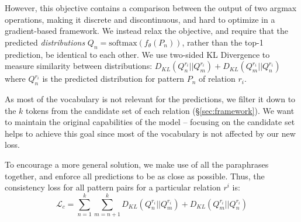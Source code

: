 

However, this objective contains a comparison between the output of two argmax operations, making it discrete and discontinuous, and hard to optimize in a gradient-based framework. We instead relax the objective, and require that the predicted \emph{distributions} $Q_n = \mbox{softmax}(f_\theta(P_n))$, rather than the top-1 prediction, be identical to each other. %
We use two-sided KL Divergence to measure similarity between distributions: $D_{KL}(Q_n^{r_i}||Q_m^{r_i}) + D_{KL}(Q_m^{r_i}||Q_n^{r_i})$
where $Q_n^{r_i}$ is the predicted distribution for pattern $P_n$ of relation $r_i$.


As most of the vocabulary is not relevant for the
predictions, we filter it down to the $k$ tokens from the candidate set of each
relation (\S\ref{sec:framework}). We want to
maintain the original capabilities of the
model -- focusing on the candidate set helps to achieve this goal since most of the vocabulary is not affected by our new
loss.


To encourage a more general solution, we make use of all the paraphrases together, and enforce all predictions to be as close as possible.
Thus, the consistency loss for all pattern pairs for a particular relation $r^i$ is:
\[
\mathcal{L}_{c} = \sum_{n=1}^k \sum_{m=n+1}^k D_{KL}(Q^{r_i}_n||Q^{r_i}_m) + D_{KL}(Q^{r_i}_m||Q^{r_i}_n)
\]


